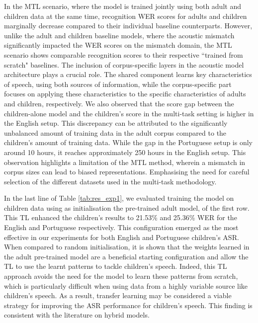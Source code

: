 In the \ac{MTL} scenario, where the model is trained jointly using both adult and children data at the same time, recognition \ac{WER} scores for adults and children marginally decrease compared to their individual baseline counterparts. However, unlike the adult and children baseline models, where the acoustic mismatch significantly impacted the \ac{WER} scores on the mismatch domain, the \ac{MTL} scenario shows comparable recognition scores to their respective ``trained from scratch" baselines. The inclusion of corpus-specific layers in the acoustic model architecture plays a crucial role. The shared component learns key characteristics of speech, using both sources of information, while the corpus-specific part focuses on applying these characteristics to the specific characteristics of adults and children, respectively. We also observed that the score gap between the children-alone model and the children's score in the multi-task setting is higher in the English setup. This discrepancy can be attributed to the significantly unbalanced amount of training data in the adult corpus compared to the children's amount of training data. While the gap in the Portuguese setup is only around 10 hours, it reaches approximately 250 hours in the English setup. This observation highlights a limitation of the \ac{MTL} method, wherein a mismatch in corpus sizes can lead to biased representations. Emphasising the need for careful selection of the different datasets used in the multi-task methodology.

In the last line of Table \ref{tab:res_exp1}, we evaluated training the model on children data using as initialisation the pre-trained adult model, of the first row. This \ac{TL} enhanced the children's results to 21.53\% and 25.36\% \ac{WER} for the English and Portuguese respectively. This configuration emerged as the most effective in our experiments for both English and Portuguese children's \ac{ASR}. When compared to random initialisation, it is shown that the weights learned in the adult pre-trained model are a beneficial starting configuration and allow the \ac{TL} to use the learnt patterns to tackle children's speech. Indeed, this \ac{TL} approach avoids the need for the model to learn these patterns from scratch, which is particularly difficult when using data from a highly variable source like children's speech. As a result, transfer learning may be considered a viable strategy for improving the \ac{ASR} performance for children's speech. This finding is consistent with the literature on hybrid models\cite{TransferLF,TFchildren}. 


